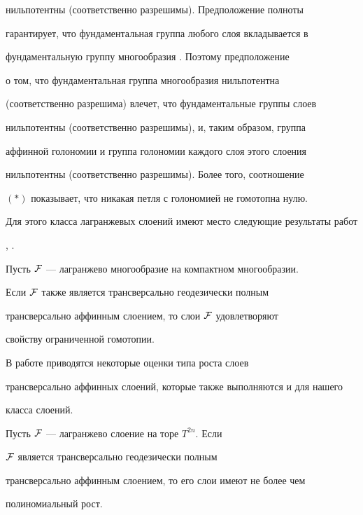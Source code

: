нильпотентны (соответственно разрешимы). Предположение полноты


гарантирует, что фундаментальная группа любого слоя вкладывается в


фундаментальную группу многообразия \cite{WO8}. Поэтому предположение


о том, что фундаментальная группа многообразия нильпотентна


(соответственно разрешима) влечет, что фундаментальные группы слоев


нильпотентны (соответственно разрешимы), и, таким образом, группа


аффинной голономии и группа голономии каждого слоя этого слоения


нильпотентны (соответственно разрешимы). Более того, соотношение


$(*)$ показывает, что никакая петля с голономией не гомотопна нулю.





Для этого класса лагранжевых слоений имеют место следующие результаты работ


\cite{SC}, \cite{WO8}.





\begin{thm}


Пусть $\cal F$ --- лагранжево многообразие на компактном многообразии.


Если $\cal F$ также является трансверсально геодезически полным


трансверсально аффинным слоением, то слои $\cal F$ удовлетворяют


свойству ограниченной гомотопии.


\end{thm}





В работе \cite{WO8} приводятся некоторые оценки типа роста слоев


трансверсально аффинных слоений, которые также выполняются и для нашего


класса слоений.





\begin{prop}


Пусть $\cal F$ --- лагранжево слоение на торе $T^{2n}$. Если


$\cal F$ является трансверсально геодезически полным


трансверсально аффинным слоением, то его слои имеют не более чем


полиномиальный рост.


\end{prop}





